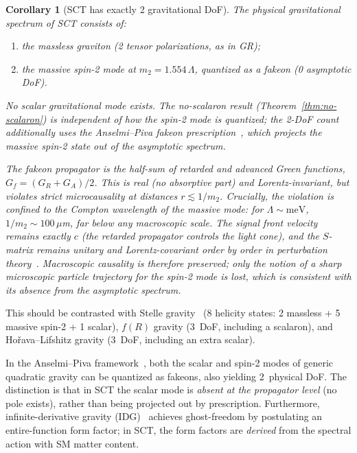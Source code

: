 \documentclass[12pt,a4paper]{article}
\newtheorem{corollary}[theorem]{Corollary}
\newcommand{\Lam}{\Lambda}
\begin{document}
\begin{corollary}[SCT has exactly 2 gravitational DoF]
\label{cor:dof}
The physical gravitational spectrum of SCT consists of:
\begin{enumerate}[label=(\roman*)]
  \item the massless graviton (2 tensor polarizations, as in GR);
  \item the massive spin-2 mode at $m_2 = 1.554\,\Lam$, quantized
        as a fakeon (0 asymptotic DoF).
\end{enumerate}
No scalar gravitational mode exists. The no-scalaron result
(Theorem~\ref{thm:no-scalaron}) is independent of how the spin-2 mode
is quantized; the 2-DoF count additionally uses the Anselmi--Piva
fakeon prescription~\cite{Anselmi2017,AP2018}, which projects the
massive spin-2 state out of the asymptotic spectrum.

The fakeon propagator is the half-sum of retarded and advanced Green
functions, $G_f = (G_R + G_A)/2$. This is real (no absorptive part)
and Lorentz-invariant, but violates strict microcausality at distances
$r \lesssim 1/m_2$. Crucially, the violation is confined to the
Compton wavelength of the massive mode: for $\Lam \sim \mathrm{meV}$,
$1/m_2 \sim 100\,\mu$m, far below any macroscopic scale. The signal
front velocity remains exactly $c$ (the retarded propagator controls
the light cone), and the $S$-matrix remains unitary and Lorentz-covariant
order by order in perturbation theory~\cite{AP2018b}. Macroscopic
causality is therefore preserved; only the notion of a sharp microscopic
particle trajectory for the spin-2 mode is lost, which is consistent
with its absence from the asymptotic spectrum.
\end{corollary}

This should be contrasted with Stelle gravity~\cite{Stelle1977}
(8 helicity states: 2 massless + 5 massive spin-2 + 1 scalar),
$f(R)$ gravity (3~DoF, including a scalaron), and Ho\v{r}ava--Lifshitz
gravity (3~DoF, including an extra scalar).

In the Anselmi--Piva framework~\cite{AP2018b}, both the scalar and
spin-2 modes of generic quadratic gravity can be quantized as fakeons,
also yielding 2~physical DoF. The distinction is that in SCT the scalar
mode is \emph{absent at the propagator level} (no pole exists), rather
than being projected out by prescription. Furthermore, infinite-derivative
gravity (IDG)~\cite{BMS2012} achieves ghost-freedom by postulating an
entire-function form factor; in SCT, the form factors are \emph{derived}
from the spectral action with SM matter content.
\end{document}
